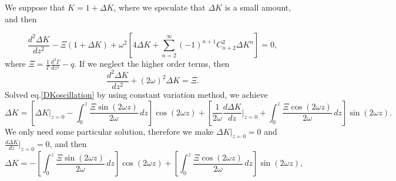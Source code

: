\documentclass[
 jor,
 amsmath,amssymb,preprint,
]{revtex4-2}
\begin{document}
We suppose that $K=1+\Delta K$, where we speculate that $\Delta K$ is a small amount, and then
\begin{comment}
\begin{equation}
    \frac{d^2 \Delta K}{d z^2}-\left(\frac{1}{\Gamma}\frac{d^2\Gamma}{d z^2}-q\right)(1+\Delta K)+\omega^2(1+\Delta K)\sum_{n=1}^{\infty}(-1)^{n+1}\frac{(n+3)!}{n!3!}{(\Delta K)}^n=0.
\end{equation}
\end{comment}
\begin{comment}
\begin{equation}
    \frac{d^2 \Delta K}{d z^2}-\left(\frac{1}{\Gamma}\frac{d^2\Gamma}{d z^2}-q\right)(1+\Delta K)+\omega^2(1+\Delta K)\sum_{n=0}^{\infty}(-1)^{n+1}C^3_{n+3}{(\Delta K)}^n=0,
\end{equation}
\end{comment}
\begin{comment}
\begin{equation}
    \frac{d^2 \Delta K}{d z^2}-\left(\frac{1}{\Gamma}\frac{d^2\Gamma}{d z^2}-q\right)(1+\Delta K)+\omega^2[4\Delta K+\sum_{n=1}^{\infty}((-1)^{n+1}(C^3_{n+3}-C^3_{n+4})){(\Delta K)}^{n+1}]=0.
\end{equation}
\end{comment}
\begin{equation}
    \frac{d^2 \Delta K}{d z^2}-\Xi(1+\Delta K)+\omega^2\left[4\Delta K+\sum_{n=2}^{\infty}(-1)^{n+1}C^2_{n+2}{\Delta K}^n\right]=0,
\end{equation}
where $\Xi=\frac{1}{\Gamma}\frac{d^2\Gamma}{d z^2}-q$. 
If we neglect the higher order terms, then
\begin{equation}\label{DKoscillation}
    \frac{d^2 \Delta K}{d z^2}+(2\omega)^2\Delta K=\Xi.
\end{equation}
Solved eq.\eqref{DKoscillation} by using constant variation method, we achieve
\begin{equation}
    \Delta K=\left[\Delta K|_{z=0}-\int_{0}^z\frac{\Xi\sin(2\omega z)}{2\omega}\,d z\right]\cos(2\omega z)+\left[\frac{1}{2\omega}\frac{d \Delta K}{d z}|_{z=0}+\int_{0}^z\frac{\Xi\cos(2\omega z)}{2\omega}\,d z\right]\sin(2\omega z).
\end{equation}
We only need some particular solution, therefore we make $\Delta K|_{z=0}=0$ and $\frac{d \Delta K}{d z}|_{z=0}=0$, and then
\begin{equation}
    \Delta K=-\left[\int_{0}^z\frac{\Xi\sin(2\omega z)}{2\omega}\,d z\right]\cos(2\omega z)+\left[\int_{0}^z\frac{\Xi\cos(2\omega z)}{2\omega}\,d z\right]\sin(2\omega z),
\end{equation}
\end{document}

